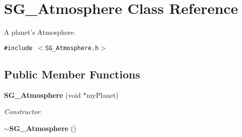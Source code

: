 \section{SG\_\-Atmosphere Class Reference}
\label{class_s_g___atmosphere}
A planet's Atmosphere.  


{\tt \#include $<$SG\_\-Atmosphere.h$>$}

\subsection*{Public Member Functions}
\begin{CompactItemize}
\item 
{\bf SG\_\-Atmosphere} (void $\ast$my\-Planet)
\begin{CompactList}\small\item\em Constructor. \item\end{CompactList}\item 
{\bf $\sim$SG\_\-Atmosphere} ()\label{class_s_g___atmosphere_a1}


\end{CompactItemize}
